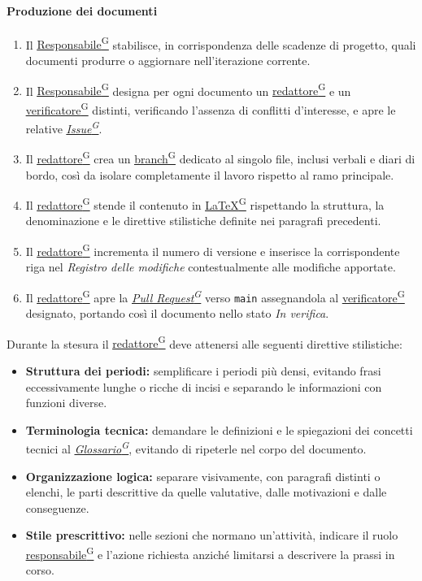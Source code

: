 \documentclass[a4paper,12pt]{article}
\providecommand{\glslink}[2]{\href{https://alittlebyte-19.github.io/Documentazione/glossario.html\#gls-#1}{\underline{#2}\textsuperscript{\scriptsize G}}}
\begin{document}
\paragraph{Produzione dei documenti}
\begin{enumerate}
    \item Il \glslink{responsabile}{Responsabile} stabilisce, in corrispondenza delle scadenze di progetto, quali documenti produrre o aggiornare nell'iterazione corrente.
    \item Il \glslink{responsabile}{Responsabile} designa per ogni documento un \glslink{redattore}{redattore} e un \glslink{verificatore}{verificatore} distinti, verificando l'assenza di conflitti d'interesse, e apre le relative \textit{\glslink{issue}{Issue}}.
    \item Il \glslink{redattore}{redattore} crea un \glslink{branch}{branch} dedicato al singolo file, inclusi verbali e diari di bordo, così da isolare completamente il lavoro rispetto al ramo principale.
    \item Il \glslink{redattore}{redattore} stende il contenuto in \glslink{latex}{LaTeX} rispettando la struttura, la denominazione e le direttive stilistiche definite nei paragrafi precedenti.
    \item Il \glslink{redattore}{redattore} incrementa il numero di versione e inserisce la corrispondente riga nel \textit{Registro delle modifiche} contestualmente alle modifiche apportate.
    \item Il \glslink{redattore}{redattore} apre la \textit{\glslink{pull-request}{Pull Request}} verso \texttt{main} assegnandola al \glslink{verificatore}{verificatore} designato, portando così il documento nello stato \textit{In verifica}.
\end{enumerate}

Durante la stesura il \glslink{redattore}{redattore} deve attenersi alle seguenti direttive stilistiche:
\begin{itemize}
    \item \textbf{Struttura dei periodi:} semplificare i periodi più densi, evitando frasi eccessivamente lunghe o ricche di incisi e separando le informazioni con funzioni diverse.
    \item \textbf{Terminologia tecnica:} demandare le definizioni e le spiegazioni dei concetti tecnici al \textit{\glslink{glossario}{Glossario}}, evitando di ripeterle nel corpo del documento.
    \item \textbf{Organizzazione logica:} separare visivamente, con paragrafi distinti o elenchi, le parti descrittive da quelle valutative, dalle motivazioni e dalle conseguenze.
    \item \textbf{Stile prescrittivo:} nelle sezioni che normano un'attività, indicare il ruolo \glslink{responsabile}{responsabile} e l'azione richiesta anziché limitarsi a descrivere la prassi in corso.
\end{itemize}
\end{document}
